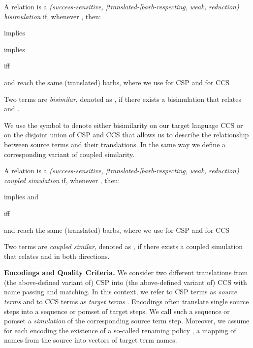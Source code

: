 \documentclass[copyright,creativecommons]{eptcs}
\begin{document}
\begin{definition}[Bisimulation]
	A relation  is a \emph{(success-sensitive, [translated-]barb-respecting, weak, reduction) bisimulation} if, whenever , then:
	\begin{compactitem}
		\item  implies 
		\item  implies 
		\item  iff 
		\item  and  reach the same (translated) barbs, where we use  for CSP and  for CCS
	\end{compactitem}
	Two terms  are \emph{bisimilar}, denoted as , if there exists a bisimulation that relates  and .
\end{definition}

\noindent
We use the symbol  to denote either bisimilarity on our target language CCS or on the disjoint union of CSP and CCS that allows us to describe the relationship between source terms and their translations. In the same way we define a corresponding variant of coupled similarity.

\begin{definition}
	A relation  is a \emph{(success-sensitive, [translated-]barb-respecting, weak, reduction) coupled simulation} if, whenever , then:
	\begin{compactitem}
		\item  implies  and 
		\item  iff 
		\item  and  reach the same (translated) barbs, where we use  for CSP and  for CCS
	\end{compactitem}
	Two terms  are \emph{coupled similar}, denoted as , if there exists a coupled simulation that relates  and  in both directions.
\end{definition}

\vspace{0.3em}
\noindent
\textbf{Encodings and Quality Criteria.}\;
We consider two different translations from (the above-defined variant of) CSP into (the above-defined variant of) CCS with name passing and matching. 
In this context, we refer to CSP terms as \emph{source terms}  and to CCS terms as \emph{target terms} . 
Encodings often translate single source steps into a sequence or pomset of target steps. We call such a sequence or pomset a \emph{simulation} of the corresponding source term step.
Moreover, we assume for each encoding the existence of a so-called renaming policy , \ie a mapping of names from the source into vectors of target term names.
\end{document}
